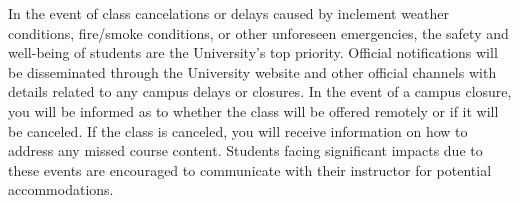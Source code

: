 In the event of class cancelations or delays caused by inclement weather
conditions, fire/smoke conditions, or other unforeseen emergencies, the safety
and well-being of students are the University's top priority. Official
notifications will be disseminated through the University website and other
official channels with details related to any campus delays or closures. In the
event of a campus closure, you will be informed as to whether the class will be
offered remotely or if it will be canceled. If the class is canceled, you will
receive information on how to address any missed course content. Students facing
significant impacts due to these events are encouraged to communicate with their
instructor for potential accommodations.
